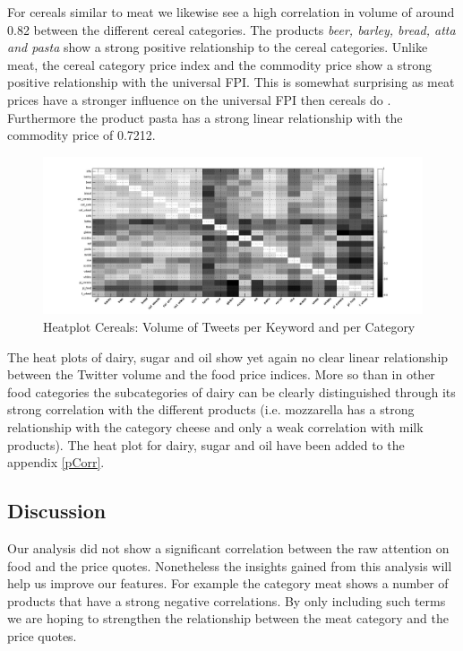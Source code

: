 For cereals similar to meat we likewise see a high correlation in volume of around 0.82 between the different cereal categories. The products \emph{beer, barley, bread, atta and pasta} show a strong positive relationship to the cereal categories. Unlike meat, the cereal category price index and the commodity price show a strong positive relationship with the universal FPI. This is somewhat surprising as meat prices have a stronger influence on the universal FPI then cereals do \cite{fao2008}. Furthermore the product pasta has a strong linear relationship with the commodity price of 0.7212.
\begin{figure}[H]
        \centering
         \includegraphics[width=1\textwidth ]{img/anal/black_cereals}
              
        \caption{Heatplot Cereals: Volume of Tweets per Keyword and per Category}
        \label{fig:distribution}
\end{figure}
 

The heat plots of dairy, sugar and oil show yet again no clear linear relationship between the Twitter volume and the food price indices. More so than in other food categories the subcategories of dairy can be clearly distinguished through its strong correlation with the different products (i.e. mozzarella has a strong relationship with the category cheese and only a weak correlation with milk products). The heat plot for dairy, sugar and oil have been added to the appendix \ref{pCorr}.



\subsection{Discussion} 

Our analysis did not show a significant correlation between the raw attention on food and the price quotes.
Nonetheless the insights gained from this analysis will help us improve our features. For example the category meat shows a number of products that have a strong negative correlations. By only including such terms we are hoping to strengthen the relationship between the meat category and the price quotes.


